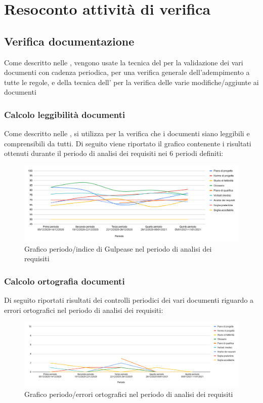
\section{Resoconto attività di verifica}

\subsection{Verifica documentazione}
 Come descritto nelle , vengono usate la tecnica del   per la validazione dei vari documenti con cadenza periodica, per una verifica generale dell'adempimento a tutte le regole, e della tecnica dell'  per la verifica delle varie modifiche/aggiunte ai documenti

\subsubsection{Calcolo leggibilità documenti}
Come descritto nelle , si utilizza  per la verifica che i documenti siano leggibili e comprensibili da tutti. 
Di seguito viene riportato il grafico contenente i risultati ottenuti durante il periodo di analisi dei requisiti nei 6 periodi definiti:

\begin{figure}[H]
	\centering
	\includegraphics[width=0.8\linewidth]{./res/images/gulpease.png}
	\caption{Grafico periodo/indice di Gulpease nel periodo di analisi dei requisiti}
	\label{fig:Grafico indice di Gulpease periodo di analisi dei requisiti}
\end{figure}

\subsubsection{Calcolo ortografia documenti}
Di seguito riportati risultati dei controlli periodici dei vari documenti riguardo a errori ortografici nel periodo di analisi dei requisiti:
\begin{figure}[H]
	\centering
	\includegraphics[width=0.8\linewidth]{./res/images/ortografia.png}
	\caption{Grafico periodo/errori ortografici nel periodo di analisi dei requisiti}
	\label{fig:Grafico errori ortografici periodo di analisi dei requisiti}
\end{figure}

